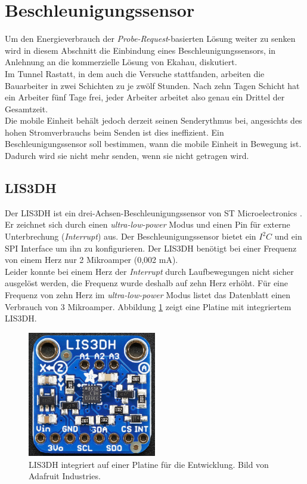 \section{Beschleunigungssensor}
\label{ch:Beschleunigungssensor}
Um den Energieverbrauch der \emph{Probe-Request}-basierten Lösung weiter zu senken wird in diesem Abschnitt die Einbindung eines Beschleunigungssensors, in Anlehnung an die kommerzielle Lösung von Ekahau, diskutiert. \\
Im Tunnel Rastatt, in dem auch die Versuche stattfanden, arbeiten die Bauarbeiter in zwei Schichten zu je zwölf Stunden. 
Nach zehn Tagen Schicht hat ein Arbeiter fünf Tage frei, jeder Arbeiter arbeitet also genau ein Drittel der Gesamtzeit. \\
Die mobile Einheit behält jedoch derzeit seinen Senderythmus bei, angesichts des hohen Stromverbrauchs beim Senden ist dies ineffizient.
Ein Beschleunigungssensor soll bestimmen, wann die mobile Einheit in Bewegung ist. 
Dadurch wird sie nicht mehr senden, wenn sie nicht getragen wird.

\subsection{LIS3DH}
Der LIS3DH ist ein drei-Achsen-Beschleunigungssensor von ST Microelectronics \cite{st2015lis}.
Er zeichnet sich durch einen \emph{ultra-low-power} Modus und einen Pin für externe Unterbrechung (\emph{Interrupt}) aus.
Der Beschleunigungssensor bietet ein $I^2C$ und ein SPI Interface um ihn zu konfigurieren.
Der LIS3DH benötigt bei einer Frequenz von einem Herz nur 2 Mikroamper (0,002 mA).\\
Leider konnte bei einem Herz der \emph{Interrupt} durch Laufbewegungen nicht sicher ausgelöst werden, die Frequenz wurde deshalb auf zehn Herz erhöht.
Für eine Frequenz von zehn Herz im \emph{ultra-low-power} Modus listet das Datenblatt einen Verbrauch von 3 Mikroamper.
Abbildung \ref{fig:lis3dh} zeigt eine Platine mit integriertem LIS3DH.

\begin{figure}[h]
  \centering
	\includegraphics[width=0.5\textwidth]{images/lis3dhada.png}
  \caption{LIS3DH integriert auf einer Platine für die Entwicklung. Bild von Adafruit Industries.}
  \label{fig:lis3dh}
\end{figure}


